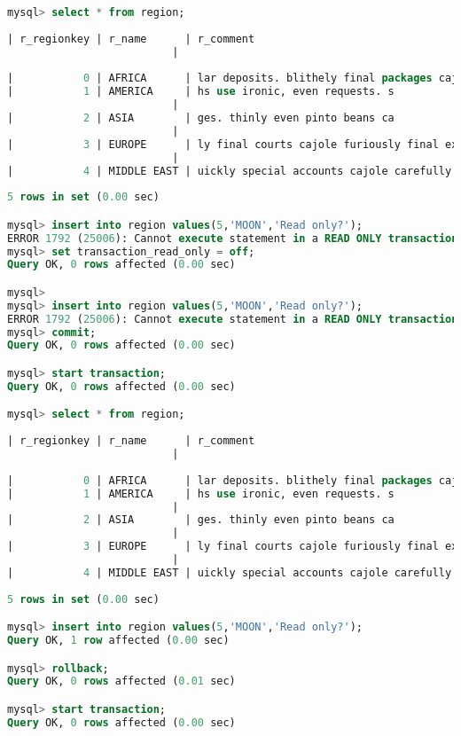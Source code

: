 \documentclass{article}
\begin{document}
\begin{lstlisting}[language=sql]
mysql> select * from region;
    
| r_regionkey | r_name      | r_comment
                          |
    
|           0 | AFRICA      | lar deposits. blithely final packages cajole. regular waters are final requests. regular accounts are according to  |
|           1 | AMERICA     | hs use ironic, even requests. s
                          |
|           2 | ASIA        | ges. thinly even pinto beans ca
                          |
|           3 | EUROPE      | ly final courts cajole furiously final excuse
                          |
|           4 | MIDDLE EAST | uickly special accounts cajole carefully blithely close requests. carefully final asymptotes haggle furiousl        |
    
5 rows in set (0.00 sec)

mysql> insert into region values(5,'MOON','Read only?');
ERROR 1792 (25006): Cannot execute statement in a READ ONLY transaction.
mysql> set transaction_read_only = off;
Query OK, 0 rows affected (0.00 sec)

mysql>
mysql> insert into region values(5,'MOON','Read only?');
ERROR 1792 (25006): Cannot execute statement in a READ ONLY transaction.
mysql> commit;
Query OK, 0 rows affected (0.00 sec)

mysql> start transaction;
Query OK, 0 rows affected (0.00 sec)

mysql> select * from region;
    
| r_regionkey | r_name      | r_comment
                          |
    
|           0 | AFRICA      | lar deposits. blithely final packages cajole. regular waters are final requests. regular accounts are according to  |
|           1 | AMERICA     | hs use ironic, even requests. s
                          |
|           2 | ASIA        | ges. thinly even pinto beans ca
                          |
|           3 | EUROPE      | ly final courts cajole furiously final excuse
                          |
|           4 | MIDDLE EAST | uickly special accounts cajole carefully blithely close requests. carefully final asymptotes haggle furiousl        |
    
5 rows in set (0.00 sec)

mysql> insert into region values(5,'MOON','Read only?');
Query OK, 1 row affected (0.00 sec)

mysql> rollback;
Query OK, 0 rows affected (0.01 sec)

mysql> start transaction;
Query OK, 0 rows affected (0.00 sec)


\end{lstlisting}
\end{document}
